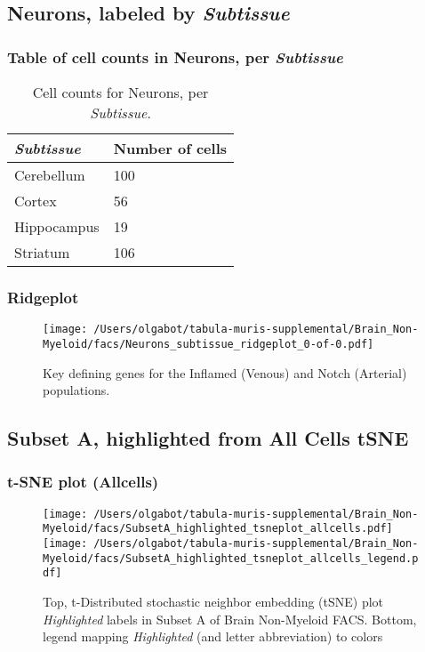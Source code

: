 \clearpage

\subsection{Neurons, labeled by \emph{Subtissue}}
\subsubsection{Table of cell counts in Neurons, per \emph{Subtissue}}\begin{table}[h]
\centering
\label{my-label}
\begin{tabular}{@{}ll@{}}
\toprule

\emph{Subtissue}& Number of cells \\ \midrule
Cerebellum & 100 \\

Cortex & 56 \\

Hippocampus & 19 \\

Striatum & 106 \\
\bottomrule
\end{tabular}
\caption{Cell counts for Neurons, per \emph{Subtissue}.}
\end{table}

\clearpage
\subsubsection{Ridgeplot}
\begin{figure}[h]
\centering
\texttt{[image: /Users/olgabot/tabula-muris-supplemental/Brain\_Non-Myeloid/facs/Neurons\_subtissue\_ridgeplot\_0-of-0.pdf]}

\caption{Key defining genes for the Inflamed (Venous) and Notch (Arterial) populations.
}
\end{figure}


\clearpage

\subsection{Subset A, highlighted from All Cells tSNE}

\subsubsection{t-SNE plot (Allcells)}
\begin{figure}[h]
\centering
\texttt{[image: /Users/olgabot/tabula-muris-supplemental/Brain\_Non-Myeloid/facs/SubsetA\_highlighted\_tsneplot\_allcells.pdf]}
\texttt{[image: /Users/olgabot/tabula-muris-supplemental/Brain\_Non-Myeloid/facs/SubsetA\_highlighted\_tsneplot\_allcells\_legend.pdf]}
\caption{Top, t-Distributed stochastic neighbor embedding (tSNE) plot  \emph{Highlighted} labels in Subset A of Brain Non-Myeloid FACS. Bottom, legend mapping \emph{Highlighted} (and letter abbreviation) to colors}
\end{figure}


